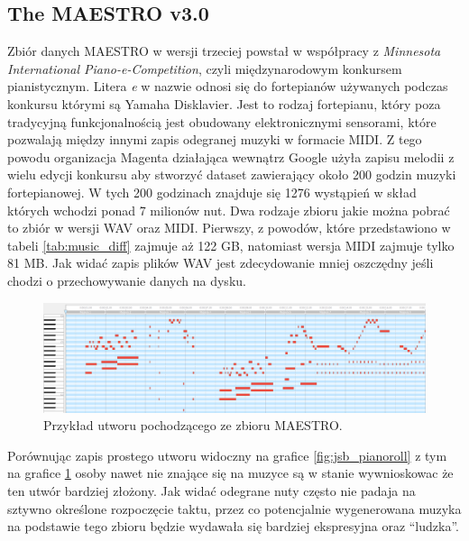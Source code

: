 \documentclass[data-science]{agh-wi} %
\begin{document}
\subsection{The MAESTRO v3.0}
Zbiór danych MAESTRO w wersji trzeciej \cite{maestrov3} powstał w współpracy z \textit{Minnesota International Piano-e-Competition}, czyli międzynarodowym konkursem pianistycznym. Litera \textit{e} w nazwie odnosi się do fortepianów używanych podczas konkursu którymi są Yamaha Disklavier. Jest to rodzaj fortepianu, który poza tradycyjną funkcjonalnością jest obudowany elektronicznymi sensorami, które pozwalają między innymi zapis odegranej muzyki w formacie MIDI. Z tego powodu organizacja Magenta działająca wewnątrz Google użyła zapisu melodii z wielu edycji konkursu aby stworzyć dataset zawierający około 200 godzin muzyki fortepianowej. W tych 200 godzinach znajduje się 1276 wystąpień w skład których wchodzi ponad 7 milionów nut. Dwa rodzaje zbioru jakie można pobrać to zbiór w wersji WAV oraz MIDI. Pierwszy, z powodów, które przedstawiono w tabeli \ref*{tab:music_diff} zajmuje aż 122 GB, natomiast wersja MIDI zajmuje tylko 81 MB. Jak widać zapis plików WAV jest zdecydowanie mniej oszczędny jeśli chodzi o przechowywanie danych na dysku.
\begin{figure}[ht!]
    \begin{center}
        \includegraphics[width=0.9\linewidth]{./img/maestro_1.png}
    \end{center}
    \caption{{Przykład utworu pochodzącego ze zbioru MAESTRO.}}\label{fig:maestro_midi}
\end{figure}

Porównując zapis prostego utworu widoczny na grafice \ref*{fig:jsb_pianoroll} z tym na grafice \ref*{fig:maestro_midi} osoby nawet nie znające się na muzyce są w stanie wywnioskowac że ten utwór bardziej złożony. Jak widać odegrane nuty często nie padaja na sztywno określone rozpoczęcie taktu, przez co potencjalnie wygenerowana muzyka na podstawie tego zbioru będzie wydawała się bardziej ekspresyjna oraz ``ludzka''.
\end{document}
